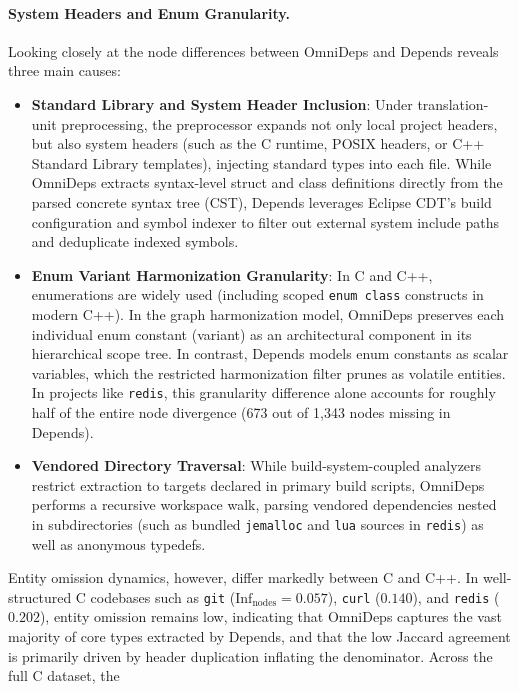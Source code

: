 \paragraph{System Headers and Enum Granularity.}
Looking closely at the node differences between OmniDeps and Depends reveals
three main causes:
\begin{itemize}
  \item \textbf{Standard Library and System Header Inclusion}: Under
    translation-unit preprocessing, the preprocessor expands not only local
    project headers, but also system headers (such as the C runtime, POSIX
    headers, or C++ Standard Library templates), injecting standard types into
    each file. While OmniDeps extracts syntax-level struct and class
    definitions directly from the parsed concrete syntax tree (CST), Depends
    leverages Eclipse CDT's build configuration and symbol indexer to filter out
    external system include paths and deduplicate indexed symbols.
  \item \textbf{Enum Variant Harmonization Granularity}: In C and C++,
    enumerations are widely used (including scoped \texttt{enum class}
    constructs in modern C++). In the graph harmonization model, OmniDeps
    preserves each individual enum constant (variant) as an architectural
    component in its hierarchical scope tree. In contrast, Depends models enum
    constants as scalar variables, which the restricted harmonization filter
    prunes as volatile entities. In projects like \texttt{redis}, this
    granularity difference alone accounts for roughly half of the entire node
    divergence (673 out of 1,343 nodes missing in Depends).
  \item \textbf{Vendored Directory Traversal}: While build-system-coupled
    analyzers restrict extraction to targets declared in primary build scripts,
    OmniDeps performs a recursive workspace walk, parsing vendored dependencies
    nested in subdirectories (such as bundled \texttt{jemalloc} and
    \texttt{lua} sources in \texttt{redis}) as well as anonymous typedefs.
\end{itemize}
Entity omission dynamics, however, differ markedly between C and C++. In
well-structured C codebases such as \texttt{git} ($\text{Inf}_{\text{nodes}} =
0.057$), \texttt{curl} ($0.140$), and \texttt{redis} ($0.202$), entity omission
remains low, indicating that OmniDeps captures the vast majority of core types
extracted by Depends, and that the low Jaccard agreement is primarily driven by
header duplication inflating the denominator. Across the full C dataset, the
